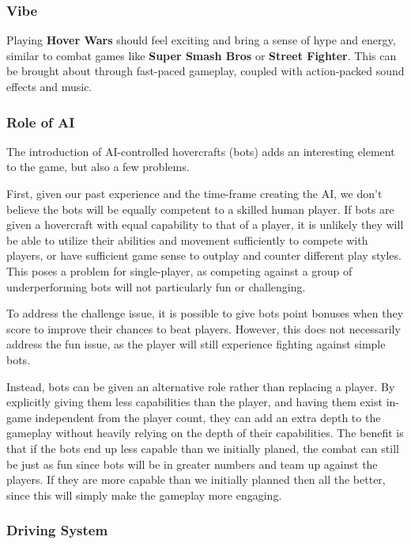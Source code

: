 \documentclass{article}
\newcommand{\namenobold}{Hover Wars}
\newcommand{\name}{\textbf{\namenobold}}
\theoremstyle{definition}
\begin{document}
\subsubsection{Vibe}

Playing \name{} should feel exciting and bring a sense of hype and energy,
similar to combat games like \textbf{Super Smash Bros} or \textbf{Street
Fighter}. This can be brought about through fast-paced gameplay, coupled with
action-packed sound effects and music.

\subsubsection{Role of AI}

The introduction of AI-controlled hovercrafts (bots) adds an interesting
element to the game, but also a few problems.

First, given our past experience and the time-frame creating the AI, we don't
believe the bots will be equally competent to a skilled human player. If bots
are given a hovercraft with equal capability to that of a player, it is
unlikely they will be able to utilize their abilities and movement sufficiently
to compete with players, or have sufficient game sense to outplay and counter
different play styles. This poses a problem for single-player, as competing
against a group of underperforming bots will not particularly fun or
challenging.

To address the challenge issue, it is possible to give bots point bonuses when
they score to improve their chances to beat players. However, this does not
necessarily address the fun issue, as the player will still experience fighting
against simple bots.

Instead, bots can be given an alternative role rather than replacing a player.
By explicitly giving them less capabilities than the player, and having them
exist in-game independent from the player count, they can add an extra depth to
the gameplay without heavily relying on the depth of their capabilities. The
benefit is that if the bots end up less capable than we initially planed, the
combat can still be just as fun since bots will be in greater numbers and team
up against the players. If they are more capable than we initially planned then
all the better, since this will simply make the gameplay more engaging.


\subsubsection{Driving System}
\end{document}
